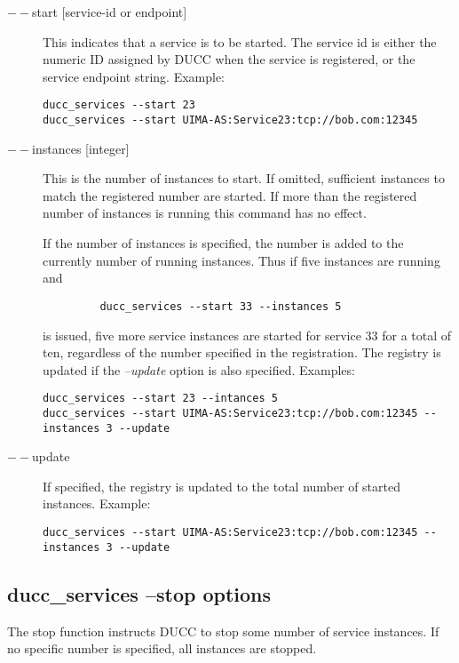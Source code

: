       \begin{description}
       \item[$--$start {[service-id or endpoint]}] This indicates that a service is to be started. The service id
         is either the numeric ID assigned by DUCC when the service is registered, or the service
         endpoint string.  Example:
\begin{verbatim}
ducc_services --start 23 
ducc_services --start UIMA-AS:Service23:tcp://bob.com:12345 
\end{verbatim}
         
       \item[$--$instances {[integer]}] This is the number of instances to start. If omitted, sufficient
         instances to match the registered number are started. If more than the registered number of
         instances is running this command has no effect.

         If the number of instances is specified, the number is added
         to the currently number of running instances. Thus if five instances are running and
\begin{verbatim}
         ducc_services --start 33 --instances 5
\end{verbatim}
         is issued, five more service instances are started for service 33 for a total of ten,
         regardless of the number specified in the registration. The registry is updated if the
         {\em --update} option is also specified. Examples:
\begin{verbatim}
ducc_services --start 23 --intances 5 
ducc_services --start UIMA-AS:Service23:tcp://bob.com:12345 --instances 3 --update 
\end{verbatim}

       \item[$--$update]If specified, the registry is updated to the total number of started
         instances.  Example:
\begin{verbatim}
ducc_services --start UIMA-AS:Service23:tcp://bob.com:12345 --instances 3 --update 
\end{verbatim}
       \end{description}

    \subsection{ducc\_services --stop options}
    The stop function instructs DUCC to stop some number of service instances. If no specific number
    is specified, all instances are stopped.

